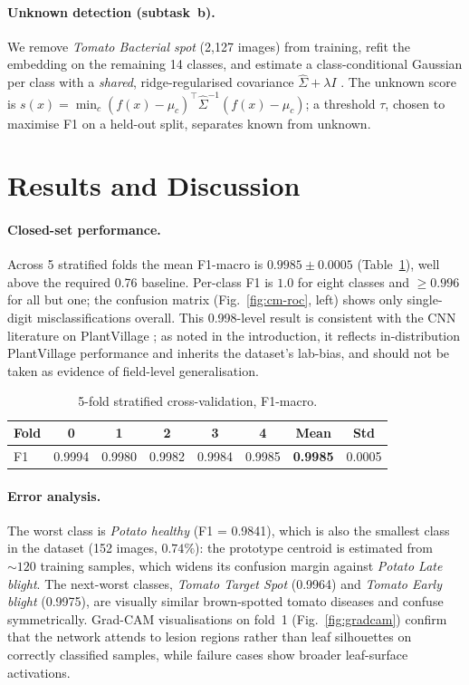 \documentclass[pdflatex,sn-mathphys-num]{sn-jnl}
\begin{document}
\paragraph{Unknown detection (subtask~b).} We remove \textit{Tomato Bacterial spot} (2{,}127 images) from training, refit the embedding on the remaining 14 classes, and estimate a class-conditional Gaussian per class with a \emph{shared}, ridge-regularised covariance $\hat{\Sigma}+\lambda I$ \cite{lee2018simple}. The unknown score is $s(x)=\min_c (f(x)-\mu_c)^\top\hat{\Sigma}^{-1}(f(x)-\mu_c)$; a threshold $\tau$, chosen to maximise F1 on a held-out split, separates known from unknown.

\section{Results and Discussion}\label{sec:results}

\paragraph{Closed-set performance.} Across 5 stratified folds the mean F1-macro is $\mathbf{0.9985\pm0.0005}$ (Table~\ref{tab:cv}), well above the required 0.76 baseline. Per-class F1 is $1.0$ for eight classes and $\geq 0.996$ for all but one; the confusion matrix (Fig.~\ref{fig:cm-roc}, left) shows only single-digit misclassifications overall. This 0.998-level result is consistent with the CNN literature on PlantVillage \cite{ferentinos2018deep}; as noted in the introduction, it reflects in-distribution PlantVillage performance and inherits the dataset's lab-bias, and should not be taken as evidence of field-level generalisation.

\begin{table}[h]
\centering\small
\caption{5-fold stratified cross-validation, F1-macro.}\label{tab:cv}
\begin{tabular}{@{}lccccccc@{}}\toprule
Fold & 0 & 1 & 2 & 3 & 4 & Mean & Std \\\midrule
F1 & 0.9994 & 0.9980 & 0.9982 & 0.9984 & 0.9985 & \textbf{0.9985} & 0.0005 \\
\bottomrule
\end{tabular}
\end{table}

\paragraph{Error analysis.} The worst class is \emph{Potato healthy} (F1 = 0.9841), which is also the smallest class in the dataset (152 images, $0.74\%$): the prototype centroid is estimated from $\sim\!120$ training samples, which widens its confusion margin against \emph{Potato Late blight}. The next-worst classes, \emph{Tomato Target Spot} (0.9964) and \emph{Tomato Early blight} (0.9975), are visually similar brown-spotted tomato diseases and confuse symmetrically. Grad-CAM visualisations on fold~1 (Fig.~\ref{fig:gradcam}) confirm that the network attends to lesion regions rather than leaf silhouettes on correctly classified samples, while failure cases show broader leaf-surface activations.
\end{document}
